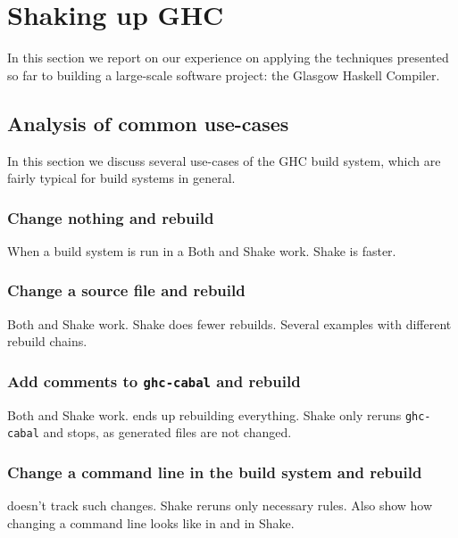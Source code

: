\section{Shaking up GHC\label{sec:ghc}}

In this section we report on our experience on applying the techniques presented
so far to building a large-scale software project: the Glasgow Haskell Compiler.


\subsection{Analysis of common use-cases}

In this section we discuss several use-cases of the GHC build system, which
are fairly typical for build systems in general.

\subsubsection{Change nothing and rebuild}

When a build system is run in a 
Both \make{} and Shake work. Shake is faster.

\subsubsection{Change a source file and rebuild}

Both \make{} and Shake work. Shake does fewer rebuilds. Several examples with
different rebuild chains.

\subsubsection{Add comments to \texttt{ghc-cabal} and rebuild}
 
Both \make{} and Shake work. \make{} ends up rebuilding everything. Shake only
reruns \texttt{ghc-cabal} and stops, as generated files are not changed.

\subsubsection{Change a command line in the build system and rebuild}

\make{} doesn't track such changes. Shake reruns only necessary rules.
Also show how changing a command line looks like in \make{} and in Shake.

